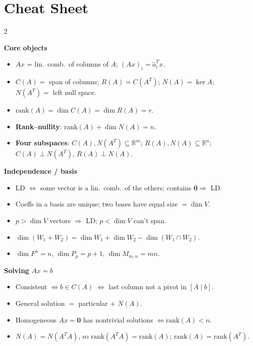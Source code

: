\documentclass[hidelinks]{article}
\begin{document}
\section{Cheat Sheet}
\begin{multicols}{2}
\small
\raggedright

\textbf{\color{Thistle}Core objects}
\begin{itemize}[leftmargin=1.1em,itemsep=1pt,topsep=1pt]
    \item $Ax$ = lin.\ comb.\ of columns of $A$; $(Ax)_i = \tilde a_i^Tx$.
    \item $C(A)=$ span of columns; $R(A)=C(A^T)$; $N(A)=\ker A$; $N(A^T)=$ left null space.
    \item $\mathrm{rank}(A)=\dim C(A)=\dim R(A)=r$.
    \item \textbf{Rank--nullity}: $\mathrm{rank}(A)+\dim N(A)=n$.
    \item \textbf{Four subspaces}: $C(A),N(A^T)\subseteq\mathbb{R}^m$; $R(A),N(A)\subseteq\mathbb{R}^n$; $C(A)\perp N(A^T)$, $R(A)\perp N(A)$.
\end{itemize}

\textbf{\color{Thistle}Independence / basis}
\begin{itemize}[leftmargin=1.1em,itemsep=1pt,topsep=1pt]
    \item LD $\iff$ some vector is a lin.\ comb.\ of the others; contains $\mathbf 0\Rightarrow$ LD.
    \item Coeffs in a basis are unique; two bases have equal size $=\dim V$.
    \item $p>\dim V$ vectors $\Rightarrow$ LD; $p<\dim V$ can't span.
    \item $\dim(W_1{+}W_2)=\dim W_1+\dim W_2-\dim(W_1\cap W_2)$.
    \item $\dim F^n{=}n$, $\dim P_p{=}p{+}1$, $\dim M_{m,n}{=}mn$.
\end{itemize}

\textbf{\color{Thistle}Solving $Ax=b$}
\begin{itemize}[leftmargin=1.1em,itemsep=1pt,topsep=1pt]
    \item Consistent $\iff b\in C(A)$ $\iff$ last column not a pivot in $[A\mid b]$.
    \item General solution $=$ particular $+$ $N(A)$.
    \item Homogeneous $Ax=\mathbf 0$ has nontrivial solutions $\iff \mathrm{rank}(A)<n$.
    \item $N(A)=N(A^TA)$, so $\mathrm{rank}(A^TA)=\mathrm{rank}(A)$; $\mathrm{rank}(A)=\mathrm{rank}(A^T)$.
\end{itemize}


\end{multicols}
\end{document}
